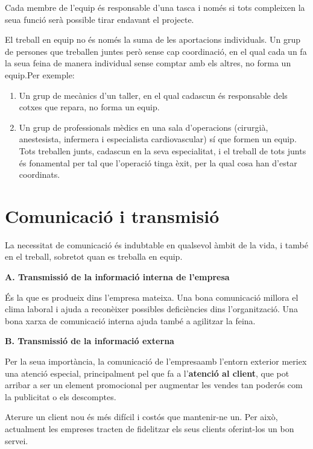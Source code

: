 \documentclass[
  openany]{book}
\begin{document}
Cada membre de l'equip és responsable d'una tasca i només si tots compleixen la seua funció serà possible tirar endavant el projecte.

El treball en equip no és només la suma de les aportacions individuals. Un grup de persones que treballen juntes però sense cap coordinació, en el qual cada un fa la seua feina de manera individual sense comptar amb els altres, no forma un equip.Per exemple:

\begin{enumerate}
\def\labelenumi{\alph{enumi}.}
\item
  Un grup de mecànics d'un taller, en el qual cadascun és responsable dels cotxes que repara, no forma un equip.
\item
  Un grup de professionals mèdics en una sala d'operacions (cirurgià, anestesista, infermera i especialista cardiovascular) sí que formen un equip. Tots treballen junts, cadascun en la seva especialitat, i el treball de tots junts és fonamental per tal que l'operació tinga èxit, per la qual cosa han d'estar coordinats.
\end{enumerate}

\hypertarget{comunicaciuxf3-i-transmisiuxf3}{%
\chapter{Comunicació i transmisió}\label{comunicaciuxf3-i-transmisiuxf3}}

La necessitat de comunicació és indubtable en qualsevol àmbit de la vida, i també en el treball, sobretot quan es treballa en equip.

\textbf{A. Transmissió de la informació interna de l'empresa}

És la que es produeix dins l'empresa mateixa. Una bona comunicació millora el clima laboral i ajuda a reconèixer possibles deficiències dins l'organització. Una bona xarxa de comunicació interna ajuda també a agilitzar la feina.

\textbf{B. Transmissió de la informació externa}

Per la seua importància, la comunicació de l'empresaamb l'entorn exterior meriex una atenció especial, principalment pel que fa a l'\textbf{atenció al client}, que pot arribar a ser un element promocional per augmentar les vendes tan poderós com la publicitat o els descomptes.

Aterure un client nou és més difícil i costós que mantenir-ne un. Per això, actualment les empreses tracten de fidelitzar els seus clients oferint-los un bon servei.
\end{document}
